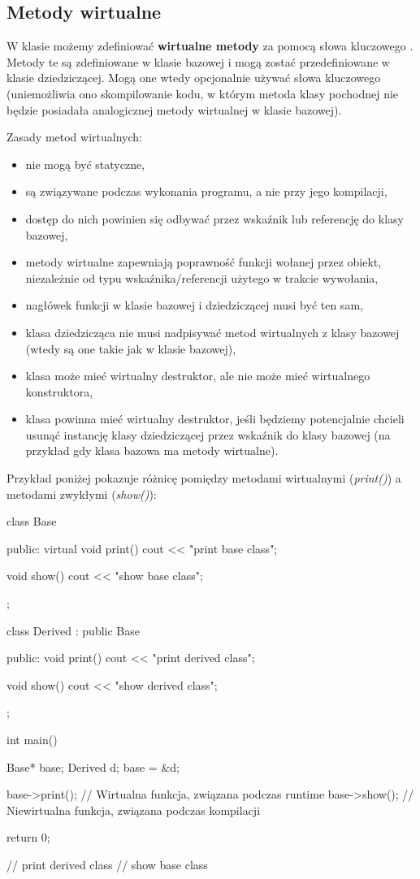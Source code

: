 \subsection{Metody wirtualne}
W klasie możemy zdefiniować \textbf{wirtualne metody} za pomocą słowa kluczowego . Metody te są zdefiniowane w klasie bazowej i mogą zostać przedefiniowane w klasie dziedziczącej. Mogą one wtedy opcjonalnie używać słowa kluczowego (uniemożliwia ono skompilowanie kodu, w którym metoda klasy pochodnej nie będzie posiadała analogicznej metody wirtualnej w klasie bazowej).

Zasady metod wirtualnych:
\begin{itemize}
    \item nie mogą być statyczne,
    \item są związywane podczas wykonania programu, a nie przy jego kompilacji,
    \item dostęp do nich powinien się odbywać przez wskaźnik lub referencję do klasy bazowej,
    \item metody wirtualne zapewniają poprawność funkcji wołanej przez obiekt, niezależnie od typu wskaźnika/referencji użytego w trakcie wywołania,
    \item nagłówek funkcji w klasie bazowej i dziedziczącej musi być ten sam,
    \item klasa dziedzicząca nie musi nadpisywać metod wirtualnych z klasy bazowej (wtedy są one takie jak w klasie bazowej),
    \item klasa może mieć wirtualny destruktor, ale nie może mieć wirtualnego konstruktora,
    \item klasa powinna mieć wirtualny destruktor, jeśli będziemy potencjalnie chcieli usunąć instancję klasy dziedziczącej przez wskaźnik do klasy bazowej (na przykład gdy klasa bazowa ma metody wirtualne).
\end{itemize}

\begin{example}
Przykład poniżej pokazuje różnicę pomiędzy metodami wirtualnymi (\textit{print()}) a metodami zwykłymi (\textit{show()}):
\begin{cpp}
    class Base {
    public:
        virtual void print() { cout << "print base class\n"; }
     
        void show() { cout << "show base class\n"; }
    };
     
    class Derived : public Base {
    public:
        void print() { cout << "print derived class\n"; }
     
        void show() { cout << "show derived class\n"; }
    };
     
    int main() {
        Base* base;
        Derived d;
        base = &d;
     
        base->print(); // Wirtualna funkcja, związana podczas runtime
        base->show();  // Niewirtualna funkcja, związana podczas kompilacji
     
        return 0;
    }
    // print derived class
    // show base class
\end{cpp}
\end{example}


